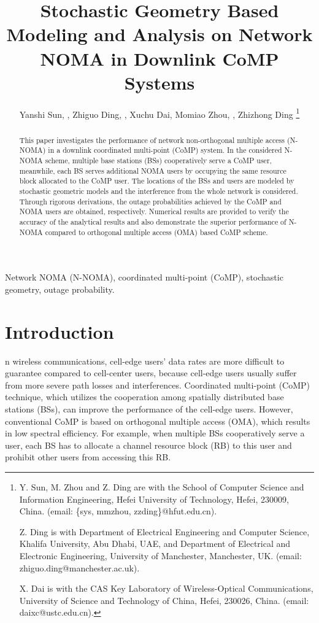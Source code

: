 \documentclass[10pt, doublecolumn]{IEEEtran}
\begin{document}
\title{Stochastic Geometry Based Modeling and Analysis on Network NOMA in Downlink CoMP Systems}
\author{Yanshi Sun, , Zhiguo Ding, , Xuchu Dai, Momiao Zhou,  , Zhizhong Ding
\thanks{
Y. Sun, M. Zhou and Z. Ding are  with the School of Computer Science and Information
Engineering, Hefei University of Technology, Hefei, 230009, China. (email: \{sys, mmzhou, zzding\}@hfut.edu.cn).

Z. Ding is with Department of Electrical Engineering and Computer
Science, Khalifa University, Abu Dhabi, UAE, and Department of Electrical
and Electronic Engineering, University of Manchester, Manchester, UK.
(email: zhiguo.ding@manchester.ac.uk).

X. Dai is with the CAS Key Laboratory of Wireless-Optical Communications, University of Science and Technology of China, Hefei, 230026, China. (email: daixc@ustc.edu.cn).
}
\vspace{-2em}}

\maketitle
\begin{abstract}
This paper investigates the performance of network non-orthogonal multiple access (N-NOMA) in a downlink coordinated multi-point (CoMP) system. In the  considered N-NOMA scheme, multiple base stations (BSs) cooperatively serve a CoMP user, meanwhile, each BS serves additional NOMA users by occupying the same resource block allocated to the CoMP user. The locations of the BSs and users are modeled by stochastic geometric models and the interference from the whole network is considered. Through rigorous derivations, the outage probabilities achieved by the CoMP and NOMA users are obtained, respectively. Numerical results are provided to verify the accuracy of the analytical results and also demonstrate the superior performance of  N-NOMA compared to orthogonal multiple access (OMA) based CoMP scheme.
\end{abstract}
\begin{IEEEkeywords}
Network NOMA (N-NOMA), coordinated multi-point (CoMP), stochastic geometry, outage probability.
\end{IEEEkeywords}
\section{Introduction}
n wireless communications, cell-edge users' data rates are more difficult to guarantee compared to cell-center users, because cell-edge users usually suffer from more severe path losses  and interferences. Coordinated multi-point (CoMP) technique, which utilizes the cooperation among spatially distributed base stations (BSs), can improve the performance of the cell-edge users\cite{irmer2011coordinated,maccartney2019millimeter}. However, conventional CoMP is based on orthogonal multiple access (OMA), which results in low spectral efficiency. For example, when multiple BSs cooperatively serve a user, each BS has to allocate a channel resource block (RB) to this user and prohibit other users from accessing this RB.
\end{document}
